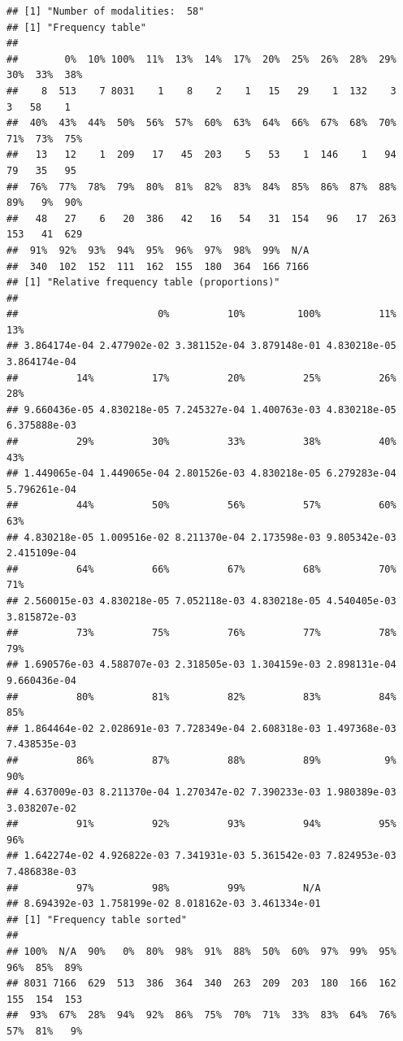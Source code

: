 \begin{verbatim}
## [1] "Number of modalities:  58"
## [1] "Frequency table"
## 
##        0%  10% 100%  11%  13%  14%  17%  20%  25%  26%  28%  29%  30%  33%  38% 
##    8  513    7 8031    1    8    2    1   15   29    1  132    3    3   58    1 
##  40%  43%  44%  50%  56%  57%  60%  63%  64%  66%  67%  68%  70%  71%  73%  75% 
##   13   12    1  209   17   45  203    5   53    1  146    1   94   79   35   95 
##  76%  77%  78%  79%  80%  81%  82%  83%  84%  85%  86%  87%  88%  89%   9%  90% 
##   48   27    6   20  386   42   16   54   31  154   96   17  263  153   41  629 
##  91%  92%  93%  94%  95%  96%  97%  98%  99%  N/A 
##  340  102  152  111  162  155  180  364  166 7166 
## [1] "Relative frequency table (proportions)"
## 
##                        0%          10%         100%          11%          13% 
## 3.864174e-04 2.477902e-02 3.381152e-04 3.879148e-01 4.830218e-05 3.864174e-04 
##          14%          17%          20%          25%          26%          28% 
## 9.660436e-05 4.830218e-05 7.245327e-04 1.400763e-03 4.830218e-05 6.375888e-03 
##          29%          30%          33%          38%          40%          43% 
## 1.449065e-04 1.449065e-04 2.801526e-03 4.830218e-05 6.279283e-04 5.796261e-04 
##          44%          50%          56%          57%          60%          63% 
## 4.830218e-05 1.009516e-02 8.211370e-04 2.173598e-03 9.805342e-03 2.415109e-04 
##          64%          66%          67%          68%          70%          71% 
## 2.560015e-03 4.830218e-05 7.052118e-03 4.830218e-05 4.540405e-03 3.815872e-03 
##          73%          75%          76%          77%          78%          79% 
## 1.690576e-03 4.588707e-03 2.318505e-03 1.304159e-03 2.898131e-04 9.660436e-04 
##          80%          81%          82%          83%          84%          85% 
## 1.864464e-02 2.028691e-03 7.728349e-04 2.608318e-03 1.497368e-03 7.438535e-03 
##          86%          87%          88%          89%           9%          90% 
## 4.637009e-03 8.211370e-04 1.270347e-02 7.390233e-03 1.980389e-03 3.038207e-02 
##          91%          92%          93%          94%          95%          96% 
## 1.642274e-02 4.926822e-03 7.341931e-03 5.361542e-03 7.824953e-03 7.486838e-03 
##          97%          98%          99%          N/A 
## 8.694392e-03 1.758199e-02 8.018162e-03 3.461334e-01 
## [1] "Frequency table sorted"
## 
## 100%  N/A  90%   0%  80%  98%  91%  88%  50%  60%  97%  99%  95%  96%  85%  89% 
## 8031 7166  629  513  386  364  340  263  209  203  180  166  162  155  154  153 
##  93%  67%  28%  94%  92%  86%  75%  70%  71%  33%  83%  64%  76%  57%  81%   9% 

\end{verbatim}
